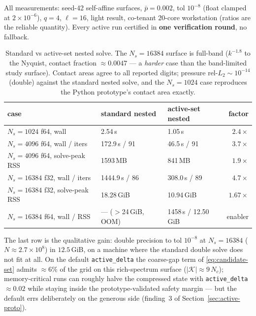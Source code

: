 \documentclass[11pt,a4paper]{article}
\newcommand{\abs}[1]{\left\lvert #1 \right\rvert}
\newcommand{\code}[1]{\texttt{#1}}
\theoremstyle{definition}
\theoremstyle{remark}
\begin{document}
All measurements: seed-42 self-affine surfaces, $\bar p=0.002$, tol
$10^{-8}$ (float clamped at $2\times10^{-6}$), $q=4$, $\ell=16$, light
result, co-tenant 20-core workstation (ratios are the reliable quantity).
Every active run certified in \textbf{one verification round}, no fallback.

\begin{table}[h]
\centering
\begin{tabular}{lllr}
\toprule
case & standard nested & active-set nested & factor \\
\midrule
$N_s{=}1024$ f64, wall            & 2.54\,s          & 1.05\,s        & $2.4\times$ \\
$N_s{=}4096$ f64, wall / iters    & 172.9\,s / 91    & 46.5\,s / 91   & $3.7\times$ \\
$N_s{=}4096$ f64, solve-peak RSS  & 1593\,MB         & 841\,MB        & $1.9\times$ \\
$N_s{=}16384$ f32, wall / iters   & 1444.9\,s / 86   & 308.0\,s / 89  & $4.7\times$ \\
$N_s{=}16384$ f32, solve-peak RSS & 18.28\,GiB       & 10.94\,GiB     & $1.67\times$ \\
$N_s{=}16384$ f64, wall / RSS     & --- ($>$24\,GiB, OOM) & 1458\,s / 12.50\,GiB & enabler \\
\bottomrule
\end{tabular}
\caption{Standard vs active-set nested solve. The $N_s=16384$ surface is
full-band ($k^{-1.8}$ to the Nyquist, contact fraction ${\approx}0.0047$ ---
a \emph{harder} case than the band-limited study surface). Contact areas
agree to all reported digits; pressure rel-$L_2\sim10^{-14}$ (double)
against the standard nested solve, and the $N_s=1024$ case reproduces the
Python prototype's contact area exactly.}
\label{tab:active-measured}
\end{table}

The last row is the qualitative gain: double precision to tol $10^{-8}$ at
$N_s=16384$ ($N\approx2.7\times10^{8}$) in $12.5$\,GiB, on a machine where
the standard double solve does not fit at all. On the default
\code{active\_delta} the coarse-gap term of \eqref{eq:candidate-set} admits
${\approx}6\%$ of the grid on this rich-spectrum surface
($\abs{\mathcal K}\approx9\,N_c$); memory-critical runs can roughly halve
the compressed state with \code{active\_delta} ${\approx}0.02$ while staying
inside the prototype-validated safety margin --- but the default errs
deliberately on the generous side (finding~3 of
Section~\ref{sec:active-proto}).
\end{document}
